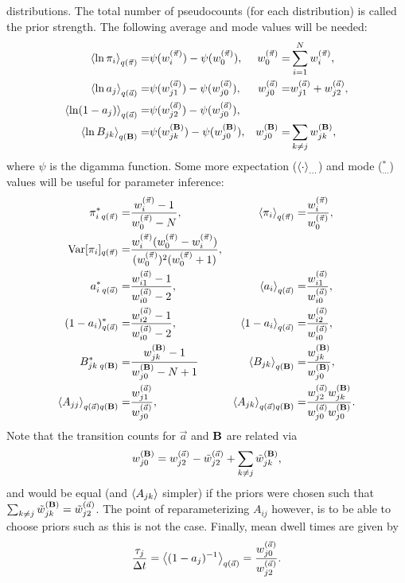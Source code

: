 distributions.  The total number of pseudocounts (for each
distribution) is called the prior strength. The following
average\cite{Beal2003} and mode values will be needed:
\begin{align}
  \left\langle \ln \pi_i\right\rangle_{q(\vec{\pi})}=&\psi(w_i^{(\vec{\pi})})-\psi(w_0^{(\vec{\pi})}),
  &w_0^{(\vec{\pi})}=&\sum_{i=1}^Nw_i^{(\vec{\pi})},\label{lnpiaverage}\\
  \left\langle \ln a_j\right\rangle_{q(\vec{a})}=&\psi(w_{j1}^{(\vec{a})})-\psi(w_{j0}^{(\vec{a})}),&
  w_{j0}^{(\vec{a})}=&w_{j1}^{(\vec{a})}+w_{j2}^{(\vec{a})},\\
  \left\langle \ln (1-a_j)\right\rangle_{q(\vec{a})}=&\psi(w_{j2}^{(\vec{a})})-\psi(w_{j0}^{(\vec{a})}),\\
  \left\langle \ln B_{jk}\right\rangle_{q(\mathbf{B})}=&\psi(w_{jk}^{(\mathbf{B})})
    -\psi(w_{j0}^{(\mathbf{B})}),&
  w_{j0}^{(\mathbf{B})}=&\sum_{k\ne j}w_{jk}^{(\mathbf{B})},
\end{align}
where $\psi$ is the digamma function.  Some more expectation
($\left\langle \cdot\right\rangle_{\ldots}$) and mode ($^*_{\ldots}$) values will be
useful for parameter inference:
\begin{align}
  \pi^*_{i\;q(\vec\pi)}=&\frac{w_i^{(\vec\pi)}-1}{w_0^{(\vec\pi)}-N}, &
  \left\langle \pi_i\right\rangle_{q(\vec{\pi})}=&\frac{w_i^{(\vec\pi)}}{w_0^{(\vec\pi)}}, \\
  \text{Var}[\pi_i]_{q(\vec{\pi})}=&
  \frac{w_i^{(\vec\pi)}(w_0^{(\vec\pi)}-w_i^{(\vec\pi)})}{
    (w_0^{(\vec\pi)})^2(w_0^{(\vec\pi)}+1)},\\
  a^*_{i\;q(\vec a)}=&\frac{w_{i1}^{(\vec{a})}-1}{w_{i0}^{(\vec{a})}-2}, &
  \left\langle a_i\right\rangle_{q(\vec{a})}=&\frac{w_{i1}^{(\vec{a})}}{w_{i0}^{(\vec{a})}},\\
  (1-a_i)^*_{q(\vec{a})}=&\frac{w_{i2}^{(\vec{a})}-1}{w_{i0}^{(\vec{a})}-2}, &
  \left\langle 1-a_i\right\rangle_{q(\vec{a})}=&\frac{w_{i2}^{(\vec{a})}}{w_{i0}^{(\vec{a})}},\\
  B^*_{jk\;q(\mathbf{B})}=&\frac{w_{jk}^{(\mathbf{B})}-1}{w_{j0}^{(\mathbf{B})}-N+1}&
  \left\langle B_{jk}\right\rangle_{q(\mathbf{B})}=&\frac{w_{jk}^{(\mathbf{B})}}{w_{j0}^{(\mathbf{B})}},\\
\left\langle A_{jj}\right\rangle_{q(\vec{a})q(\mathbf{B})}=&
\frac{w_{j1}^{(\vec{a})}}{w_{j0}^{(\vec{a})}},&
\left\langle A_{jk}\right\rangle_{q(\vec{a})q(\mathbf{B})}=&
\frac{w_{j2}^{(\vec{a})}w_{jk}^{(\mathbf{B})}}{w_{j0}^{(\vec{a})}w_{j0}^{(\mathbf{B})}}.
\end{align}
Note that the transition counts
for $\vec a$ and $\mathbf{B}$ are related via
\begin{equation}
w_{j0}^{(\mathbf{B})}=w_{j2}^{(\vec{a})}-\tilde w_{j2}^{(\vec{a})}+\sum_{k\ne j}\tilde w_{jk}^{(\mathbf{B})},
\end{equation}
and would be equal (and $\left\langle A_{jk}\right\rangle$ simpler) if the priors were
chosen such that $\sum_{k\ne j}\tilde w_{jk}^{(\mathbf{B})}=\tilde
w_{j2}^{(\vec{a})}$. The point of reparameterizing $A_{ij}$ however,
is to be able to choose priors such as this is not the case. Finally,
mean dwell times are given by
\begin{equation}
\frac{\tau_j}{\Delta t}=\left\langle (1-a_j)^{-1}\right\rangle_{q(\vec{a})}=
\frac{w_{j0}^{(\vec{a})}}{w_{j2}^{(\vec{a})}}.
\end{equation}

